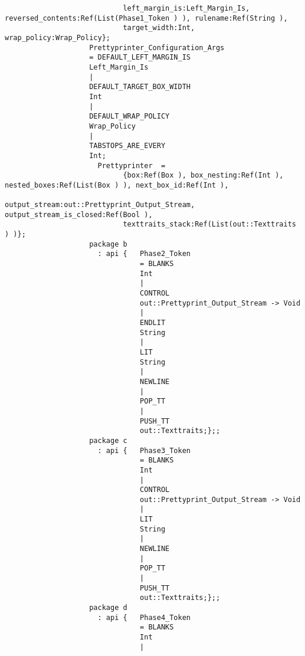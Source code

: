 \begin{verbatim}
                            left_margin_is:Left_Margin_Is, reversed_contents:Ref(List(Phase1_Token ) ), rulename:Ref(String ),
                            target_width:Int, wrap_policy:Wrap_Policy};
                    Prettyprinter_Configuration_Args
                    = DEFAULT_LEFT_MARGIN_IS
                    Left_Margin_Is
                    |
                    DEFAULT_TARGET_BOX_WIDTH
                    Int
                    |
                    DEFAULT_WRAP_POLICY
                    Wrap_Policy
                    |
                    TABSTOPS_ARE_EVERY
                    Int;
                      Prettyprinter  =
                            {box:Ref(Box ), box_nesting:Ref(Int ), nested_boxes:Ref(List(Box ) ), next_box_id:Ref(Int ),
                            output_stream:out::Prettyprint_Output_Stream, output_stream_is_closed:Ref(Bool ),
                            texttraits_stack:Ref(List(out::Texttraits ) )};
                    package b
                      : api {   Phase2_Token
                                = BLANKS
                                Int
                                |
                                CONTROL
                                out::Prettyprint_Output_Stream -> Void
                                |
                                ENDLIT
                                String
                                |
                                LIT
                                String
                                |
                                NEWLINE
                                |
                                POP_TT
                                |
                                PUSH_TT
                                out::Texttraits;};;
                    package c
                      : api {   Phase3_Token
                                = BLANKS
                                Int
                                |
                                CONTROL
                                out::Prettyprint_Output_Stream -> Void
                                |
                                LIT
                                String
                                |
                                NEWLINE
                                |
                                POP_TT
                                |
                                PUSH_TT
                                out::Texttraits;};;
                    package d
                      : api {   Phase4_Token
                                = BLANKS
                                Int
                                |

\end{verbatim}
